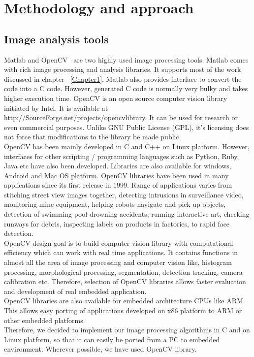 
\chapter{Methodology and approach} %
\label{Chapter2}

\section{Image analysis tools}
\indent Matlab and OpenCV~\cite{34} are two highly used image
processing tools.  Matlab comes with rich image processing and analysis
libraries. It supports most of the work discussed in chapter
~\ref{Chapter1}. Matlab also provides interface to convert the code into a C
code. However, generated C code is normally very bulky and takes higher
execution time. OpenCV is an open source computer vision library
initiated by Intel. It is available at
http://SourceForge.net/projects/opencvlibrary. It can be used for
research or even commercial purposes. Unlike GNU Public License (GPL),
it's licensing does not force that modifications to the library be made
public. \\
\indent OpenCV has been mainly developed in C and C++ on Linux platform.
However, interfaces for other scripting / programming languages such as
Python, Ruby, Java etc have also been developed. Libraries are also
available for windows, Android and Mac OS platform. OpenCV libraries
have been used in many applications since its first release in 1999.
Range of applications varies from stitching street view images together,
detecting intrusions in surveillance video, monitoring mine equipment,
helping robots navigate and pick up objects, detection of swimming pool
drowning accidents, running interactive art, checking runways for
debris, inspecting labels on products in factories, to rapid face
detection.\\
\indent OpenCV design goal is to build computer vision library with
computational efficiency which can work with real time applications. It
contains functions in almost all the area of image processing  and
computer vision like, histogram processing, morphological processing,
segmentation, detection tracking, camera calibration etc. Therefore,
selection of OpenCV libraries allows faster evaluation and development
of real embedded application.\\
\indent OpenCV libraries are also available for embedded architecture
CPUs like ARM. This allows easy porting of applications developed on x86
platform to ARM or other embedded platforms.\\
\indent Therefore, we decided to implement our image processing
algorithms in C and on Linux platform, so that it can easily be ported
from a PC to embedded environment. Wherever possible, we have used
OpenCV library.

